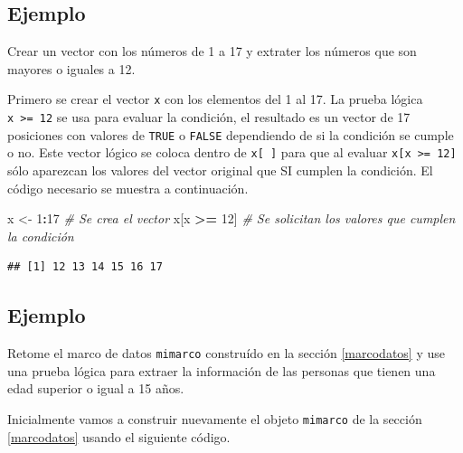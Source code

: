 \documentclass[10pt,]{krantz}
\makeatletter
\newenvironment{Shaded}{\begin{snugshade}}{\end{snugshade}}
\newcommand{\DecValTok}[1]{\textcolor[rgb]{0.00,0.00,0.81}{#1}}
\newcommand{\StringTok}[1]{\textcolor[rgb]{0.31,0.60,0.02}{#1}}
\newcommand{\CommentTok}[1]{\textcolor[rgb]{0.56,0.35,0.01}{\textit{#1}}}
\newcommand{\OperatorTok}[1]{\textcolor[rgb]{0.81,0.36,0.00}{\textbf{#1}}}
\newcommand{\NormalTok}[1]{#1}
\newenvironment{kframe}{%
\medskip{}
\setlength{\fboxsep}{.8em}
 \def\at@end@of@kframe{}%
 \ifinner\ifhmode%
  \def\at@end@of@kframe{\end{minipage}}%
  \begin{minipage}{\columnwidth}%
 \fi\fi%
 \def\FrameCommand##1{\hskip\@totalleftmargin \hskip-\fboxsep
 \colorbox{shadecolor}{##1}\hskip-\fboxsep
     \hskip-\linewidth \hskip-\@totalleftmargin \hskip\columnwidth}%
 \MakeFramed {\advance\hsize-\width
   \@totalleftmargin\z@ \linewidth\hsize
   \@setminipage}}%
 {\par\unskip\endMakeFramed%
 \at@end@of@kframe}
\renewenvironment{Shaded}{\begin{kframe}}{\end{kframe}}
\makeatother
\begin{document}
\subsection*{Ejemplo}\label{ejemplo-6}


Crear un vector con los números de 1 a 17 y extrater los números que son
mayores o iguales a 12.

Primero se crear el vector \texttt{x} con los elementos del 1 al 17. La
prueba lógica \texttt{x\ \textgreater{}=\ 12} se usa para evaluar la
condición, el resultado es un vector de 17 posiciones con valores de
\texttt{TRUE} o \texttt{FALSE} dependiendo de si la condición se cumple
o no. Este vector lógico se coloca dentro de \texttt{x{[}\ {]}} para que
al evaluar \texttt{x{[}x\ \textgreater{}=\ 12{]}} sólo aparezcan los
valores del vector original que SI cumplen la condición. El código
necesario se muestra a continuación.

\begin{Shaded}
\begin{Highlighting}[]
\NormalTok{x <-}\StringTok{ }\DecValTok{1}\OperatorTok{:}\DecValTok{17}  \CommentTok{# Se crea el vector}
\NormalTok{x[x }\OperatorTok{>=}\StringTok{ }\DecValTok{12}\NormalTok{]  }\CommentTok{# Se solicitan los valores que cumplen la condición}
\end{Highlighting}
\end{Shaded}

\begin{verbatim}
## [1] 12 13 14 15 16 17
\end{verbatim}

\subsection*{Ejemplo}\label{ejemplo-7}


Retome el marco de datos \texttt{mimarco} construído en la sección
\ref{marcodatos} y use una prueba lógica para extraer la información de
las personas que tienen una edad superior o igual a 15 años.

Inicialmente vamos a construir nuevamente el objeto \texttt{mimarco} de
la sección \ref{marcodatos} usando el siguiente código.
\end{document}
